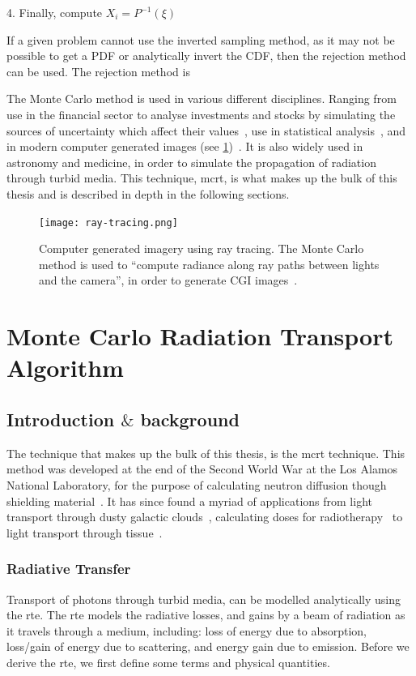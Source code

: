 4. Finally, compute $X_i = P^{-1}(\xi)$

If a given problem cannot use the inverted sampling method, as it may not be possible to get a PDF or analytically invert the CDF, then the rejection method can be used.
The rejection method is 


The Monte Carlo method is used in various different disciplines. Ranging from use in the financial sector to analyse investments and stocks by simulating the sources of uncertainty which affect their values~\cite{jackel2002monte,finaceprrof}, use in statistical analysis~\cite{wall2012practical}, and in modern computer generated images (see \cref{fig:ray-trace})~\cite{Kajiyarendering,Cookraytracing}. It is also widely used in astronomy and medicine, in order to simulate the propagation of radiation through turbid media. This technique, \gls*{mcrt}, is what makes up the bulk of this thesis and is described in depth in the following sections.

\begin{figure}[!htb]
\centering
\texttt{[image: ray-tracing.png]}
\caption{Computer generated imagery using ray tracing. The Monte Carlo method is used to ``compute radiance along ray paths between lights and the camera'', in order to generate CGI images~\cite{pharr2016physically}.}
\label{fig:ray-trace}
\end{figure}

\section{Monte Carlo Radiation Transport Algorithm}

\subsection{Introduction \texorpdfstring{$\&$}{and} background}
The technique that makes up the bulk of this thesis, is the \gls*{mcrt} technique. This method was developed at the end of the Second World War at the Los Alamos National Laboratory, for the purpose of calculating neutron diffusion though shielding material~\cite{montybeg1,eckhardt1987stan,anderson1986metropolis,ulam1947statistical}. It has since found a myriad of applications from light transport through dusty galactic clouds~\cite{wood1999model}, calculating doses for radiotherapy~\cite{rogers1995beam} to light transport through tissue~\cite{1stmonty}.



\subsubsection*{Radiative Transfer}
Transport of photons through turbid media, can be modelled analytically using the \gls*{rte}. The \gls*{rte} models the radiative losses, and gains by a beam of radiation as it travels through a medium, including: loss of energy due to absorption, loss/gain of energy due to scattering, and energy gain due to emission. Before we derive the \gls*{rte}, we first define some terms and physical quantities.


